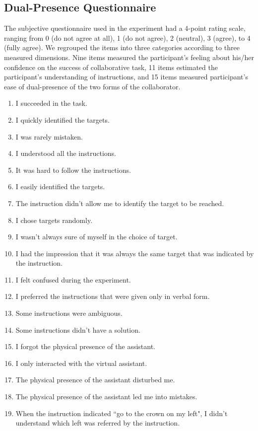 \begin{appendices}
\chapter{Dual-Presence Questionnaire}
\label{appendix:dual_pres_q}
The subjective questionnaire used in the experiment had a 4-point rating scale, ranging from 0 (do not agree at all), 1 (do not agree), 2 (neutral), 3 (agree), to 4 (fully agree). We regrouped the items into three categories according to three measured dimensions. Nine items measured the participant's feeling about his/her confidence on the success of collaborative task, 11 items estimated the participant's understanding of instructions, and 15 items measured participant's ease of dual-presence of the two forms of the collaborator.

\begin{enumerate}
	\item I succeeded in the task.
	\item I quickly identified the targets.
	\item I was rarely mistaken.
	\item I understood all the instructions.
	\item It was hard to follow the instructions.
	\item I easily identified the targets.
	\item The instruction didn't allow me to identify the target to be reached.
	\item I chose targets randomly.
	\item I wasn't always sure of myself in the choice of target.
	\item I had the impression that it was always the same target that was indicated by the instruction.
	\item I felt confused during the experiment.
	\item I preferred the instructions that were given only in verbal form.
	\item Some instructions were ambiguous.
	\item Some instructions didn't have a solution.
	\item I forgot the physical presence of the assistant.
	\item I only interacted with the virtual assistant.
	\item The physical presence of the assistant disturbed me.
	\item The physical presence of the assistant led me into mistakes.
	\item When the instruction indicated ``go to the crown on my left", I didn't understand which left was referred by the instruction.

\end{enumerate}
\end{appendices}
